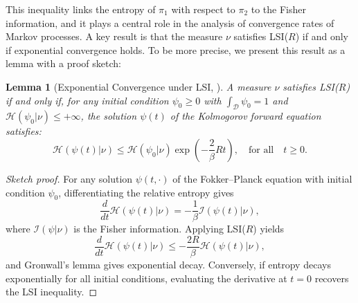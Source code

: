 \documentclass[11pt, twoside]{report}
\newtheorem{lemma}[theorem]{Lemma}
\begin{document}
This inequality links the entropy of $\pi_1$ with respect to $\pi_2$ to the Fisher information, and it plays a central role in the analysis of convergence rates of Markov processes. A key result is that the measure $\nu$ satisfies LSI($R$) if and only if exponential convergence holds. To be more precise, we present this result as a lemma with a proof sketch:
\begin{lemma}[Exponential Convergence under LSI, \texorpdfstring{\cite[Proposition~2.9]{Lelievre2016-hx}}{}]
A measure $\nu$ satisfies LSI($R$) if and only if, for any initial condition $\psi_0 \geq 0$ with $\int_\mathcal{D} \psi_0 = 1$ and $\mathcal{H}(\psi_0 | \nu) \leq +\infty$, the solution $\psi(t)$ of the Kolmogorov forward equation satisfies:
\begin{equation} \label{LSI_exponential}
    \mathcal{H}(\psi(t) | \nu) \leq \mathcal{H}(\psi_0 | \nu) \exp\left(-\frac{2}{\beta}Rt\right), \quad \text{for all} \quad t \geq 0.
\end{equation}
\end{lemma}
\begin{proof}[Sketch proof]
For any solution $\psi(t,\cdot)$ of the Fokker--Planck equation with initial condition $\psi_0$, differentiating the relative entropy gives
\[
\frac{d}{dt} \mathcal{H}(\psi(t)|\nu) = -\frac{1}{\beta} \mathcal{I}(\psi(t)|\nu),
\]
where $\mathcal{I}(\psi|\nu)$ is the Fisher information. Applying LSI($R$) yields
\[
\frac{d}{dt} \mathcal{H}(\psi(t)|\nu) \le - \frac{2 R}{\beta} \mathcal{H}(\psi(t)|\nu),
\]
and Gronwall’s lemma gives exponential decay. Conversely, if entropy decays exponentially for all initial conditions, evaluating the derivative at $t=0$ recovers the LSI inequality.
\end{proof}
\end{document}
